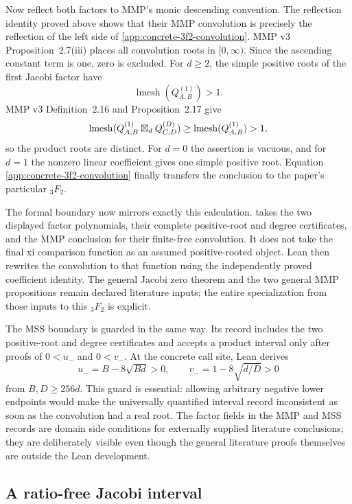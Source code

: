 Now reflect both factors to MMP's monic descending convention.  The reflection
identity proved above shows that their MMP convolution is precisely the
reflection of the left side of
\eqref{app:concrete-3f2-convolution}.  MMP v3 Proposition~2.7(iii) places all
convolution roots in $[0,\infty)$.  Since the ascending constant term is one,
zero is excluded.  For $d\ge2$, the simple positive roots of the first Jacobi
factor have
\[
 \operatorname{lmesh}(Q_{A,B}^{(1)})>1.
\]
MMP v3 Definition~2.16 and Proposition~2.17 give
\[
 \operatorname{lmesh}(Q_{A,B}^{(1)}\boxtimes_d Q_{C,D}^{(D)})
 \ge \operatorname{lmesh}(Q_{A,B}^{(1)})>1,
\]
so the product roots are distinct.  For $d=0$ the assertion is vacuous, and
for $d=1$ the nonzero linear coefficient gives one simple positive root.
Equation \eqref{app:concrete-3f2-convolution} finally transfers the conclusion
to the paper's particular ${}_3F_2$.

{\setlength{\emergencystretch}{1em}
The formal boundary now mirrors exactly this calculation.
{\small{}} takes the two displayed factor polynomials,
their complete positive-root and degree certificates, and the MMP conclusion
for their finite-free convolution.  It does not take the final xi comparison
function as an assumed positive-rooted object.
Lean then rewrites the convolution to that function using the independently
proved coefficient identity.  The general Jacobi zero theorem and the two
general MMP propositions remain declared literature inputs; the entire
specialization from those inputs to this ${}_3F_2$ is explicit.
\par}

The MSS boundary is guarded in the same way.  Its record includes the two
positive-root and degree certificates and accepts a product interval only
after proofs of $0<u_-$ and $0<v_-$.  At the concrete call site, Lean derives
\[
 u_-=B-8\sqrt{Bd}>0,\qquad
 v_-=1-8\sqrt{d/D}>0
\]
from $B,D\ge256d$.  This guard is essential: allowing arbitrary negative
lower endpoints would make the universally quantified interval record
inconsistent as soon as the convolution had a real root.  The factor fields
in the MMP and MSS records are domain side conditions for externally supplied
literature conclusions; they are deliberately visible even though the
general literature proofs themselves are outside the Lean development.

\subsection{A ratio-free Jacobi interval}

